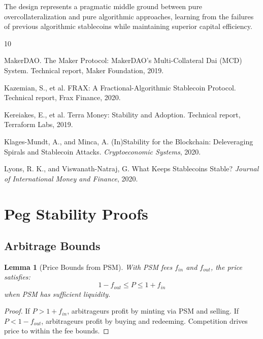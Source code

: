 \documentclass[11pt,a4paper]{article}
\newtheorem{lemma}[theorem]{Lemma}
\begin{document}
The design represents a pragmatic middle ground between pure overcollateralization and pure algorithmic approaches, learning from the failures of previous algorithmic stablecoins while maintaining superior capital efficiency.


\begin{thebibliography}{10}

MakerDAO.
\newblock The Maker Protocol: MakerDAO's Multi-Collateral Dai (MCD) System.
\newblock Technical report, Maker Foundation, 2019.

Kazemian, S., et al.
\newblock FRAX: A Fractional-Algorithmic Stablecoin Protocol.
\newblock Technical report, Frax Finance, 2020.

Kereiakes, E., et al.
\newblock Terra Money: Stability and Adoption.
\newblock Technical report, Terraform Labs, 2019.

Klages-Mundt, A., and Minca, A.
\newblock (In)Stability for the Blockchain: Deleveraging Spirals and Stablecoin Attacks.
\newblock \emph{Cryptoeconomic Systems}, 2020.

Lyons, R. K., and Viswanath-Natraj, G.
\newblock What Keeps Stablecoins Stable?
\newblock \emph{Journal of International Money and Finance}, 2020.

\end{thebibliography}

\appendix

\section{Peg Stability Proofs}

\subsection{Arbitrage Bounds}

\begin{lemma}[Price Bounds from PSM]
With PSM fees $f_{in}$ and $f_{out}$, the price satisfies:
\begin{equation}
    1 - f_{out} \leq P \leq 1 + f_{in}
\end{equation}
when PSM has sufficient liquidity.
\end{lemma}

\begin{proof}
If $P > 1 + f_{in}$, arbitrageurs profit by minting via PSM and selling. If $P < 1 - f_{out}$, arbitrageurs profit by buying and redeeming. Competition drives price to within the fee bounds.
\end{proof}
\end{document}
